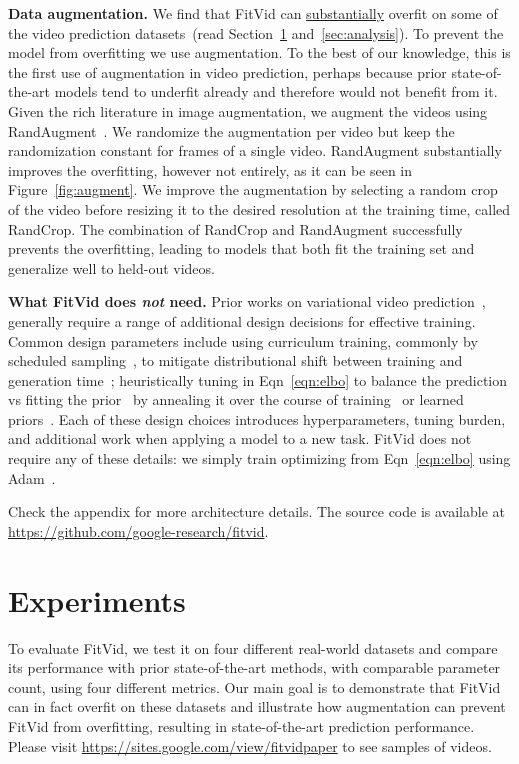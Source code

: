 \documentclass{article}
\newcommand{\model}{FitVid\xspace}
\newcommand{\website}{\url{https://sites.google.com/view/fitvidpaper}\xspace}
\newcommand{\github}{\url{https://github.com/google-research/fitvid}\xspace}
\begin{document}
\textbf{Data augmentation.} We find that \model can \underline{substantially} overfit on some of the video prediction datasets~(read Section~\ref{sec:exp} and~\ref{sec:analysis}). To prevent the model from overfitting we use augmentation. To the best of our knowledge, this is the first use of augmentation in video prediction, perhaps because prior state-of-the-art models tend to underfit already and therefore would not benefit from it. Given the rich literature in image augmentation, we augment the videos using RandAugment~\cite{cubuk2020randaugment}. We randomize the augmentation per video but keep the randomization constant for frames of a single video. RandAugment substantially improves the overfitting, however not entirely, as it can be seen in Figure~\ref{fig:augment}. We improve the augmentation by selecting a random crop of the video before resizing it to the desired resolution at the training time, called RandCrop. The combination of RandCrop and RandAugment successfully prevents the overfitting, leading to models that both fit the training set and generalize well to held-out videos. 

\textbf{What \model does \textit{not} need.} Prior works on variational video prediction~\citep{finn2016deep, babaeizadeh2017stochastic, lee2018stochastic, villegas2019high, wu2021greedy}, generally require a range of additional design decisions for effective training. Common design parameters include using curriculum training, commonly by scheduled sampling~\cite{bengio2015scheduled}, to mitigate distributional shift between training and generation time~\citep{oh2015action, finn2016unsupervised, lee2018stochastic, cenzato2019difficulty}; heuristically tuning  in Eqn~\ref{eqn:elbo} to balance the prediction vs fitting the prior~\cite{denton2018stochastic} by annealing it over the course of training~\cite{babaeizadeh2017stochastic, lee2018stochastic} or learned priors~\cite{denton2018stochastic,villegas2019high,castrejon2019improved,wu2021greedy}. Each of these design choices introduces hyperparameters, tuning burden, and additional work when applying a model to a new task. \model does not require any of these details: we simply train optimizing  from Eqn~\ref{eqn:elbo} using Adam~\cite{kingma2014adam}.

Check the appendix for more architecture details. The source code is available at \\\github.



\section{Experiments}
\label{sec:exp}
To evaluate \model, we test it on four different real-world datasets and compare its performance with prior state-of-the-art methods, with comparable parameter count, using four different metrics. Our main goal is to demonstrate that \model can in fact overfit on these datasets and illustrate how augmentation can prevent \model from overfitting, resulting in state-of-the-art prediction performance. Please visit \website to see samples of videos.
\end{document}
